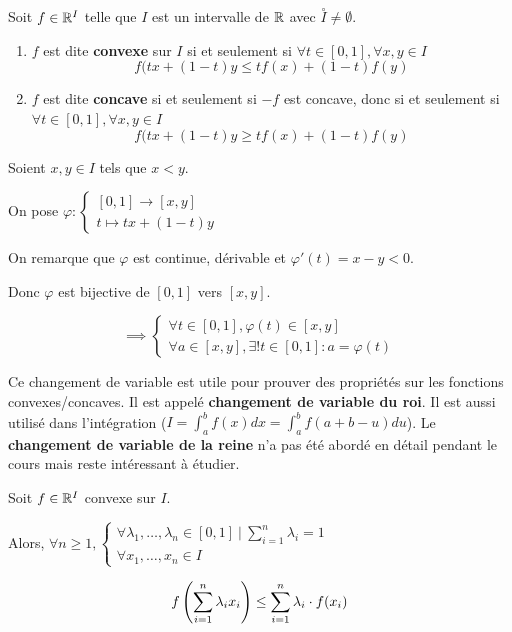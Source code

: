 \documentclass[12pt, a4paper]{report}
\begin{document}
\begin{definition}
    Soit $f \in \mathbb{R}^I$ telle que $I$ est un intervalle de $\mathbb{R}$ avec $\overset{\circ}{I}\ne\emptyset$.

    \begin{enumerate}
        \item $f$ est dite \textbf{convexe} sur $I$ si et seulement si $\forall t \in [0,1], \forall x,y \in I$\\$$f(tx+(1-t)y\le tf(x)+(1-t)f(y)$$
        \item $f$ est dite \textbf{concave} si et seulement si $-f$ est concave, donc si et seulement si $\forall t \in [0,1], \forall x,y \in I$\\$$f(tx+(1-t)y\ge tf(x)+(1-t)f(y)$$
    \end{enumerate}
\end{definition}

\begin{remark}
    Soient $x,y \in I$ tels que $x<y$.

    On pose $\varphi : \begin{cases} [0,1]\to[x,y]\\t\mapsto tx+(1-t)y \end{cases}$

    On remarque que $\varphi$ est continue, dérivable et $\varphi' (t) = x-y < 0$.

    Donc $\varphi$ est bijective de $[0,1]$ vers $[x,y]$.

    $$\implies \begin{cases}
      \forall t \in [0,1], \varphi(t) \in [x,y]\\
      \forall a \in [x,y], \exists! t \in [0,1] : a = \varphi(t)
    \end{cases}$$

    Ce changement de variable est utile pour prouver des propriétés sur les fonctions convexes/concaves. Il est appelé \textbf{changement de variable du roi}. Il est aussi utilisé dans l'intégration ($I=\int_a^b f(x)dx = \int_a^b f(a+b-u)du$). Le \textbf{changement de variable de la reine} n'a pas été abordé en détail pendant le cours mais reste intéressant à étudier.
\end{remark}

\begin{property}
    Soit $f \in \mathbb{R}^I$ convexe sur $I$.
    
    Alors, $\forall n \ge 1, \begin{cases} \forall \lambda_1,\dots,\lambda_n\in[0,1]~|~\sum_{i=1}^n\lambda_i=1\\ \forall x_1,\dots,x_n \in I\end{cases}$

    $$f\left(\sum_{i=1}^n\lambda_i x_i\right)\le \sum_{i=1}^n \lambda_i\cdot f(x_i)$$
\end{property}
\end{document}
